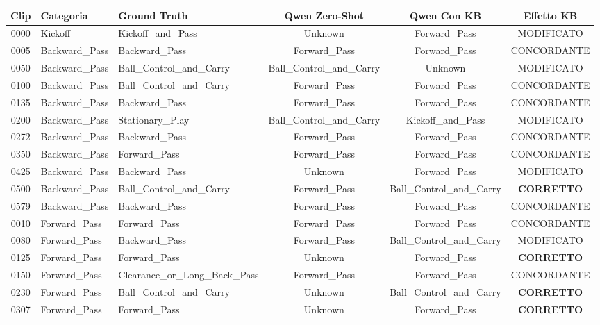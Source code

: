 \begin{table}[t]
\centering
\small
\begin{tabular}{cllccc}
\hline
\textbf{Clip} & \textbf{Categoria} & \textbf{Ground Truth} & \textbf{Qwen Zero-Shot} & \textbf{Qwen Con KB} & \textbf{Effetto KB} \\
\hline
0000 & Kickoff & Kickoff\_and\_Pass & Unknown & Forward\_Pass & MODIFICATO \\
0005 & Backward\_Pass & Backward\_Pass & Forward\_Pass & Forward\_Pass & CONCORDANTE \\
0050 & Backward\_Pass & Ball\_Control\_and\_Carry & Ball\_Control\_and\_Carry & Unknown & MODIFICATO \\
0100 & Backward\_Pass & Ball\_Control\_and\_Carry & Forward\_Pass & Forward\_Pass & CONCORDANTE \\
0135 & Backward\_Pass & Backward\_Pass & Forward\_Pass & Forward\_Pass & CONCORDANTE \\
0200 & Backward\_Pass & Stationary\_Play & Ball\_Control\_and\_Carry & Kickoff\_and\_Pass & MODIFICATO \\
0272 & Backward\_Pass & Backward\_Pass & Forward\_Pass & Forward\_Pass & CONCORDANTE \\
0350 & Backward\_Pass & Forward\_Pass & Forward\_Pass & Forward\_Pass & CONCORDANTE \\
0425 & Backward\_Pass & Backward\_Pass & Unknown & Forward\_Pass & MODIFICATO \\
0500 & Backward\_Pass & Ball\_Control\_and\_Carry & Forward\_Pass & Ball\_Control\_and\_Carry & \textbf{CORRETTO} \\
0579 & Backward\_Pass & Backward\_Pass & Forward\_Pass & Forward\_Pass & CONCORDANTE \\
0010 & Forward\_Pass & Forward\_Pass & Forward\_Pass & Forward\_Pass & CONCORDANTE \\
0080 & Forward\_Pass & Backward\_Pass & Forward\_Pass & Ball\_Control\_and\_Carry & MODIFICATO \\
0125 & Forward\_Pass & Forward\_Pass & Unknown & Forward\_Pass & \textbf{CORRETTO} \\
0150 & Forward\_Pass & Clearance\_or\_Long\_Back\_Pass & Forward\_Pass & Forward\_Pass & CONCORDANTE \\
0230 & Forward\_Pass & Ball\_Control\_and\_Carry & Unknown & Ball\_Control\_and\_Carry & \textbf{CORRETTO} \\
0307 & Forward\_Pass & Forward\_Pass & Unknown & Forward\_Pass & \textbf{CORRETTO} \\

\end{tabular}
\end{table}
